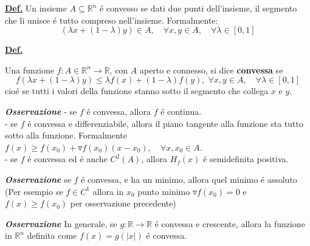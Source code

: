 \documentclass[a4paper,10pt]{article} %
\renewcommand{\b}[1]{%
    {\textbf{#1}}}
\newcommand{\ldef}[1]{%
    {\smallbreak\par\tiny\textbf{\underline{Def.}} {#1} \smallbreak}}
\newcommand{\loss}[1]{%
    {\smallbreak\par\tiny\emph{\textbf{Osservazione}} {#1} \par}}
\begin{document}
\begin{multicols}{6}
\ldef{
    Un insieme $A \subseteq \mathbb{R}^n$ \'e convesso se dati 
    due punti dell'insieme, il segmento che li unisce \'e tutto compreso
    nell'insieme. Formalmente:
    \[
        (\lambda x + (1 - \lambda) y) \in A, \quad \forall x, y \in A, \quad
        \forall \lambda \in [0, 1]
    \]
}

\ldef{
    Una funzione $f:A\in\mathbb{R}^n\rightarrow\mathbb{R}$, con $A$
    aperto e connesso, si dice \b{convessa} se 
    \[
        f(\lambda x+(1-\lambda)y) \leq \lambda f(x) + (1-\lambda)f(y)
        ,\; \forall x, y \in A, \quad \forall \lambda \in [0, 1]
    \]
    cio\'e se tutti i valori della funzione stanno sotto il segmento 
    che collega $x$ e $y$.
    \loss{
        - se $f$ \'e convessa, allora $f$ \'e continua.\\
        - se $f$ \'e convessa e differenziabile, allora il piano
        tangente alla funzione sta tutto sotto alla funzione.
        Formalmente $f(x) \geq f(x_0) + \triangledown f (x_0)(x - x_0),
        \quad \forall x, x_0 \in A$. \\
        - se $f$ \'e convessa ed \'e anche $C^2(A)$, allora $H_f(x)$ \'e
        semidefinita positiva.
    }
    \loss{
        se $f$ \'e convessa, e ha un minimo, allora quel minimo \'e assoluto
        (Per esempio se $f \in C^1$ allora in $x_0$ punto minimo
        $\triangledown f(x_0) = 0$ e $f(x) \geq f(x_0)$ per osservazione
        precedente)
    }
    \loss{
        In generale, se $g:\mathbb{R} \rightarrow \mathbb{R}$ \'e convessa
        e crescente, allora la funzione in $\mathbb{R}^n$ definita come
        $f(x) = g (|x|)$ \'e convessa.
    }
}


\end{multicols}
\end{document}
